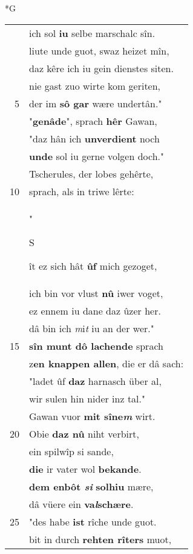 \documentclass[8pt,a4paper,notitlepage]{article}
\begin{document}
\newpage
\begin{table}[ht]
\begin{minipage}[t]{0.5\linewidth}
\small
\begin{center}*G
\end{center}
\begin{tabular}{rl}
 & ich sol \textbf{iu} selbe marschalc sîn.\\ 
 & liute unde guot, swaz heizet mîn,\\ 
 & daz kêre ich iu gein dienstes siten.\\ 
 & nie gast zuo wirte kom geriten,\\ 
5 & der im \textbf{sô gar} wære undertân."\\ 
 & "\textbf{genâde}", sprach \textbf{hêr} Gawan,\\ 
 & "daz hân ich \textbf{unverdient} noch\\ 
 & \textbf{unde} sol iu gerne volgen doch."\\ 
 & Tscherules, der lobes gehêrte,\\ 
10 & sprach, als in triwe lêrte:\\ 
 & "\begin{large}S\end{large}ît ez sich hât \textbf{ûf} mich gezoget,\\ 
 & ich bin vor vlust \textbf{nû} iwer voget,\\ 
 & ez ennem iu dane daz ûzer her.\\ 
 & dâ bin ich \textit{m}i\textit{t} iu an der wer."\\ 
15 & \textbf{sîn munt dô lachende} sprach\\ 
 & z\textbf{en knappen allen}, die er dâ sach:\\ 
 & "ladet ûf \textbf{daz} harnasch über al,\\ 
 & wir sulen hin nider inz tal."\\ 
 & Gawan vuor \textbf{mit sîne\textit{m}} wirt.\\ 
20 & Obie \textbf{daz nû} niht verbirt,\\ 
 & ein spilwîp si sande,\\ 
 & \textbf{die} ir vater wol \textbf{bekande}.\\ 
 & \textbf{dem enbôt \textit{si}} \textbf{solhiu} mære,\\ 
 & dâ vüere ein \textbf{va\textit{l}schære}.\\ 
25 & "des habe \textbf{ist} rîche unde guot.\\ 
 & bit in durch \textbf{rehten rîters} muot,\\ 

\end{tabular}
\end{minipage}
\end{table}
\end{document}
